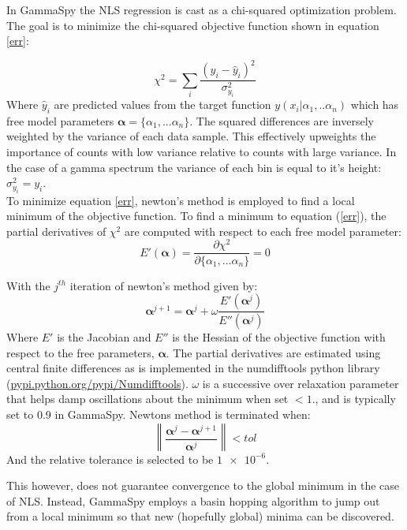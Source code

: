 \documentclass[10pt]{article}
\begin{document}
In GammaSpy the NLS regression is cast as a chi-squared optimization problem.
The goal is to minimize the chi-squared objective function shown in equation \ref{err}:

\begin{equation}
    \chi^2 = \sum_i \frac{(y_i - \hat y_i)^2}{\sigma_{y_i}^2}
    \label{err}
\end{equation}
Where $\hat y_i$ are predicted values from the target function $y(x_i|\alpha_1,
.. \alpha_n)$ which has free model parameters $\bm{\alpha} = \{\alpha_1, ... \alpha_n\}$.
The squared differences are inversely weighted by the variance of each data
sample.  This effectively upweights the importance of counts with low variance
relative to counts with large variance.  In the case of a gamma spectrum the
variance of each bin is equal to it's height: $\sigma_{y_i}^2 = y_i$. \\

To minimize equation \ref{err}, newton's method is employed to find a local
minimum of the objective function.  To find a minimum to equation (\ref{err}), the partial derivatives of $\chi^2$ are
computed with respect to each free model parameter:
\begin{equation}
    E'(\bm \alpha) = \frac{\partial \chi^2}{\partial \{\alpha_1, ... \alpha_n\}} = 0
\end{equation}

With the $j^{th}$ iteration of newton's method given by:
\begin{equation}
    \bm \alpha^{j+1} = \bm \alpha^j +  \omega \frac{E'(\bm \alpha^j)}{ E''(\bm \alpha^j)}
\end{equation}
Where $E'$ is the Jacobian and $E''$ is the Hessian of the objective function with
respect to the free parameters, $\bm{\alpha}$.  The partial derivatives are estimated using
central finite differences as is implemented in the numdifftools python library (\url{pypi.python.org/pypi/Numdifftools}). $\omega$ is a successive over
relaxation parameter that helps damp oscillations about the minimum when set $<1.$, and is
typically set to 0.9 in GammaSpy.  Newtons method is terminated when:
\begin{equation}
    \left\lVert \frac{\bm \alpha^j - \bm \alpha^{j+1}}{\bm \alpha^j}\right\rVert < tol
\end{equation}
And the relative tolerance is selected to be $\SI{1e-6}$.

This however, does not guarantee convergence
to the global minimum in the case of NLS.  Instead, GammaSpy employs a basin
hopping algorithm to jump out from a local minimum so that new (hopefully
global) minima can be discovered. \\
\end{document}
